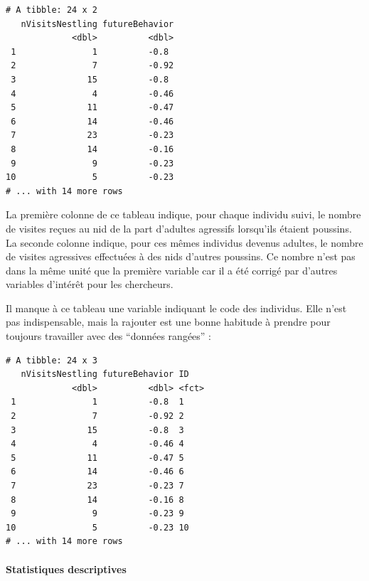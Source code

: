 \documentclass[a4paperpaper,]{article}
\newenvironment{Shaded}{\begin{snugshade}}{\end{snugshade}}
\newcommand{\DataTypeTok}[1]{\textcolor[rgb]{0.00,0.34,0.68}{#1}}
\newcommand{\DecValTok}[1]{\textcolor[rgb]{0.69,0.50,0.00}{#1}}
\newcommand{\KeywordTok}[1]{\textcolor[rgb]{0.12,0.11,0.11}{\textbf{#1}}}
\newcommand{\NormalTok}[1]{\textcolor[rgb]{0.12,0.11,0.11}{#1}}
\newcommand{\OperatorTok}[1]{\textcolor[rgb]{0.12,0.11,0.11}{#1}}
\newcommand{\StringTok}[1]{\textcolor[rgb]{0.75,0.01,0.01}{#1}}
\let\oldparagraph\paragraph
\renewcommand{\paragraph}[1]{\oldparagraph{#1}\mbox{}}
\begin{document}
\begin{verbatim}
# A tibble: 24 x 2
   nVisitsNestling futureBehavior
             <dbl>          <dbl>
 1               1          -0.8 
 2               7          -0.92
 3              15          -0.8 
 4               4          -0.46
 5              11          -0.47
 6              14          -0.46
 7              23          -0.23
 8              14          -0.16
 9               9          -0.23
10               5          -0.23
# ... with 14 more rows
\end{verbatim}

La première colonne de ce tableau indique, pour chaque individu suivi, le nombre de visites reçues au nid de la part d'adultes agressifs lorsqu'ils étaient poussins. La seconde colonne indique, pour ces mêmes individus devenus adultes, le nombre de visites agressives effectuées à des nids d'autres poussins. Ce nombre n'est pas dans la même unité que la première variable car il a été corrigé par d'autres variables d'intérêt pour les chercheurs.

Il manque à ce tableau une variable indiquant le code des individus. Elle n'est pas indispensable, mais la rajouter est une bonne habitude à prendre pour toujours travailler avec des ``données rangées'' :

\begin{Shaded}
\end{Shaded}

\begin{verbatim}
# A tibble: 24 x 3
   nVisitsNestling futureBehavior ID   
             <dbl>          <dbl> <fct>
 1               1          -0.8  1    
 2               7          -0.92 2    
 3              15          -0.8  3    
 4               4          -0.46 4    
 5              11          -0.47 5    
 6              14          -0.46 6    
 7              23          -0.23 7    
 8              14          -0.16 8    
 9               9          -0.23 9    
10               5          -0.23 10   
# ... with 14 more rows
\end{verbatim}

\hypertarget{statistiques-descriptives-4}{%
\paragraph{Statistiques descriptives}\label{statistiques-descriptives-4}}
\end{document}
